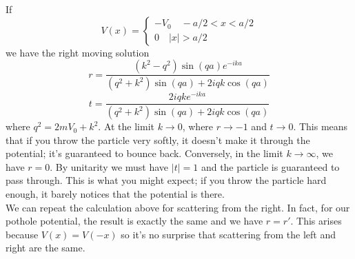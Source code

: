 \begin{example}
If
\[V(x) = \begin{cases} -V_0  \quad -a/2 < x < a/2 \\ 0 \quad |x| > a/2 \end{cases}\]
we have the right moving solution
\[r = \frac{(k^2-q^2)\sin(qa)e^{-ika}}{(q^2+k^2)\sin(qa) + 2iqk\cos(qa)}\]
\[t = \frac{2iqke^{-ika}}{(q^2+k^2)\sin(qa) + 2iqk\cos(qa)}\]
where $q^2 = 2mV_0 + k^2$. At the limit $k \to 0$, where $r \to -1$ and $t \to 0$. This means that if you throw the particle very softly, it doesn't make it through the potential; it's guaranteed to bounce back. Conversely, in the limit $k \to \infty$, we have $r = 0$. By unitarity we must have $|t| = 1$ and the particle is guaranteed to pass through. This is what you might expect; if you throw the particle hard enough, it barely notices that the potential is there.
\\
We can repeat the calculation above for scattering from the right. In fact, for our pothole potential, the result is exactly the same and we have $r = r'$. This arises because $V (x) = V (−x)$ so it's no surprise that scattering from the left and right are the same.
\end{example}

